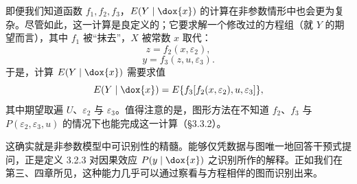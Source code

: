 即便我们知道函数 $f_1,f_2,f_3$，$E(Y\mid \dox{x})$ 的计算在非参数情形中也会更为复杂。尽管如此，这一计算是良定义的；它要求解一个修改过的方程组（就 $Y$ 的期望而言），其中 $f_1$ 被“抹去”，$X$ 被常数 $x$ 取代：
\begin{equation}
z=f_2(x,\varepsilon_2), \tag{5.21}
\end{equation}
\begin{equation}
y=f_3(z,u,\varepsilon_3). \tag{5.22}
\end{equation}
于是，计算 $E(Y\mid \dox{x})$ 需要求值
\[
E(Y\mid \dox{x})=E\{f_3[f_2(x,\varepsilon_2),u,\varepsilon_3]\},
\]
其中期望取遍 $U$、$\varepsilon_2$ 与 $\varepsilon_3$。值得注意的是，图形方法在不知道 $f_2$、$f_3$ 与 $P(\varepsilon_2,\varepsilon_3,u)$ 的情况下也能完成这一计算（\S 3.3.2）。

这确实就是非参数模型中可识别性的精髓。能够仅凭数据与图唯一地回答干预式提问，正是定义 3.2.3 对因果效应 $P(y\mid \dox{x})$ 之识别所作的解释。正如我们在第三、四章所见，这种能力几乎可以通过察看与方程相伴的图而识别出来。
